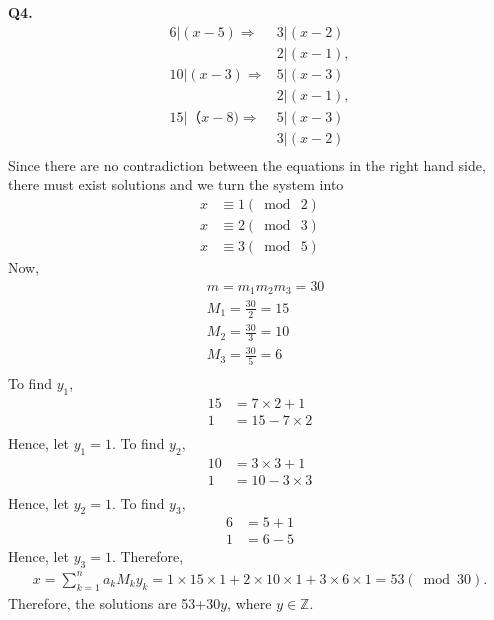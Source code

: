 \documentclass{article}[12pt]
\begin{document}
\noindent \textbf{Q4.}
\begin{align*}
6|(x-5)
\Rightarrow &3|(x-2)\\
&2|(x-1),\\
10|(x-3) \Rightarrow &5|(x-3)\\
&2|(x-1),\\
15|（x-8) \Rightarrow &5|(x-3)\\
&3|(x-2)\\
\end{align*}
Since there are no contradiction between the equations in the right hand side, there must exist solutions and we turn the system into 
\begin{align*}
x&\equiv 1 (\bmod\ 2)\\
x&\equiv 2 (\bmod\ 3)\\
x&\equiv 3 (\bmod\ 5)
\end{align*}
Now, 
\begin{align*}
&m=m_1m_2m_3=30\\
&M_1=\frac{30}{2}=15\\
&M_2=\frac{30}{3}=10\\
&M_3=\frac{30}{5}=6\\
\end{align*}
To find $y_1$, 
\begin{align*}
15&=7\times 2+1\\
1&=15-7\times 2\\
\end{align*}
Hence, let $y_1=1$. To find $y_2$, 
\begin{align*}
10&=3\times 3+1\\
1&=10-3\times 3\\
\end{align*}
Hence, let $y_2=1$. To find $y_3$, 
\begin{align*}
6&=5+1\\
1&=6-5
\end{align*}
Hence, let $y_3=1$. Therefore, 
\begin{align*}
x=\sum_{k=1}^{n}a_kM_ky_k=1\times 15\times 1+2\times 10\times 1+3\times 6\times 1=53 (\bmod 30). 
\end{align*}
Therefore, the solutions are 53+30$y$, where $y\in \mathbb{Z}$.
\\
\end{document}
